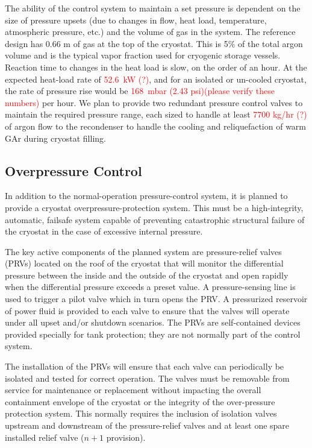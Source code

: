 The ability of the control system to maintain a set pressure is 
dependent on the size of pressure upsets (due to changes in flow, 
heat load, temperature, atmospheric pressure, etc.) and the volume 
of gas in the system.  The reference design has 0.66 m 
of gas at the top of the cryostat.  This is 5\% of the total 
argon volume and is the typical vapor fraction used for cryogenic 
storage vessels. Reaction time to changes in the heat load is slow, 
on the order of an hour.  At the expected heat-load rate of 
\textcolor{red}{52.6~kW (?)}, and for an isolated or un-cooled cryostat,
the rate of pressure rise would be \textcolor{red}{168~mbar (2.43 psi)(please verify these numbers)} per hour. 
We plan to provide two redundant pressure control valves to maintain the required pressure range, each sized to handle at least \textcolor{red}{7700 kg/hr (?)} of argon flow to the recondenser to handle the cooling and
reliquefaction of warm GAr during cryostat filling.


\subsection{Overpressure Control}

In addition to the normal-operation pressure-control system, 
it is planned to provide a cryostat overpressure-protection 
system. This must be a high-integrity, automatic, failsafe
system capable of preventing catastrophic structural failure
of the cryostat in the case of excessive internal pressure.

The key active components of the planned system are pressure-relief valves (PRVs) located on the roof of the cryostat that will monitor the differential pressure between the inside and the outside of the cryostat and open rapidly when the 
differential pressure exceeds a preset value. 
 A pressure-sensing line is used to trigger a pilot valve which in turn opens the PRV.
A pressurized reservoir of power fluid is provided to each valve to ensure that the valves will operate under all upset and/or shutdown scenarios.  The PRVs are self-contained devices provided specially for tank protection; they are not normally part of the control system. 

The installation of the PRVs will ensure that each valve can periodically be isolated and tested for correct operation.  The valves must be removable from service for maintenance 
or replacement without impacting the overall containment envelope of the cryostat or the integrity of the 
over-pressure protection system.  This normally requires the inclusion of isolation valves upstream and downstream of the pressure-relief valves and at least one spare installed relief valve ($n+1$ provision).

